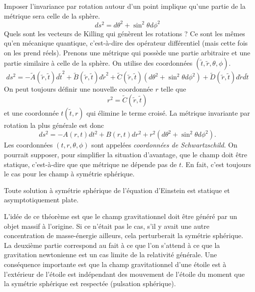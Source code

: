 \documentclass[a4paper,11pt]{report}
\begin{document}
        Imposer l'invariance par rotation autour d'un point implique qu'une partie de la métrique sera celle de la sphère.
        \begin{equation}
            ds^2 = d\theta^2+\sin^2\theta d\phi^2
        \end{equation}
        Quels sont les vecteurs de Killing qui génèrent les rotations ? Ce sont les mêmes qu'en mécanique quantique, c'est-à-dire des opérateur différentiel (mais cette fois on les prend réels). Prenons une métrique qui possède une partie arbitraire et une partie similaire à celle de la sphère. On utilise des coordonnées $(\tilde{t},\tilde{r},\theta,\phi)$.
        \begin{equation}
            ds^2 = -\tilde{A}(\tilde{r},\tilde{t}) d\tilde{t}^2+\tilde{B}(\tilde{r},\tilde{t}) d\tilde{r}^2 + \tilde{C}(\tilde{r},\tilde{t}) (d\theta^2+\sin^2\theta d\phi^2)+\tilde{D}(\tilde{r},\tilde{t}) d\tilde{r}d\tilde{t}
        \end{equation}
        On peut toujours définir une nouvelle coordonnée $r$ telle que
        \begin{equation}
            r^2 = \tilde{C}(\tilde{r},\tilde{t})
        \end{equation}
        et une coordonnée $t(\tilde{t},r)$ qui élimine le terme croisé. La métrique invariante par rotation la plus générale est donc
        \begin{equation}
            ds^2 = -A(r,t)dt^2+B(r,t)dr^2+r^2(d\theta^2+\sin^2\theta d\phi^2).
        \end{equation}
        Les coordonnées $(t,r,\theta,\phi)$ sont appelées \textit{coordonnées de Schwartzschild}. On pourrait supposer, pour simplifier la situation d'avantage, que le champ doit être statique, c'est-à-dire que que métrique ne dépende pas de $t$. En fait, c'est toujours le cas pour les champ à symétrie sphérique.
        
        \begin{thm}[de Birkhoff]\begin{leftbar}
            Toute solution à symétrie sphérique de l'équation d'Einstein est statique et asymptotiquement plate.
        \end{leftbar}\end{thm}
        
        L'idée de ce théorème est que le champ gravitationnel doit être généré par un objet massif à l'origine. Si ce n'était pas le cas, s'il y avait une autre concentration de masse-énergie ailleurs, cela perturberait la symétrie sphérique. La deuxième partie correspond au fait à ce que l'on s'attend à ce que la gravitation newtonienne est un cas limite de la relativité générale. Une conséquence importante est que la champ gravitationnel d'une étoile est à l'extérieur de l'étoile est indépendant des mouvement de l'étoile du moment que la symétrie sphérique est respectée (pulsation sphérique).\\
        
\end{document}
